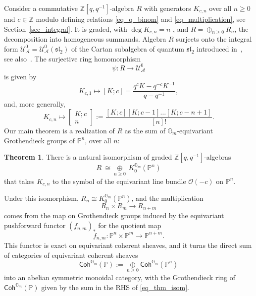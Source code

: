 \documentclass{article}
\def\lra{\longrightarrow}
\def\mf{\mathfrak}
\def\Z{\mathbb Z}
\newcommand{\Coh}{\mathsf{Coh}}
\newcommand{\mcO}{\mathcal{O}}
\newcommand{\mcA}{\mathcal{A}}
\newcommand{\PP}{\mathbb{P}}
\newcommand{\UzeroA}{\mathcal{U}^0_{\mcA}}
\newcommand{\bmat}[3]{
  \begin{bmatrix}
    #1 ; #2 \\
    #3
  \end{bmatrix}
}
\newcommand{\oplusop}[1]{{\mathop{\oplus}\limits_{#1}}}
\theoremstyle{definition}
\newtheorem{thm}{Theorem}[section]
\theoremstyle{definition}
\begin{document}
Consider a commutative $\Z[q,q^{-1}]$-algebra $R$ with generators $K_{c,n}$ over all $n\ge 0$ and $c\in \Z$ modulo defining relations \eqref{eq_q_binom} and \eqref{eq_multiplication},  see Section~\ref{sec_integral}. It is graded, with $\deg K_{c,n}=n$ , and $R=\oplus_{n\ge 0}R_n$,  the decomposition into homogeneous summands. Algebra $R$ surjects onto the integral form $\UzeroA=\UzeroA(\mf{sl}_2)$ of the Cartan subalgebra of quantum $\mf{sl}_2$ introduced in~\cite{Lusztig2,Lusztig1}, see also~\cite{MartinezRuiz2025,GMSW1}.  The surjective ring homomorphism
\begin{equation}\label{eq_hom_surj}
\psi:R\lra \UzeroA
\end{equation}
is given by
\[
K_{c,1}\longmapsto [K;c] = \frac{q^c K - q^{-c} K^{-1}}{q-q^{-1}},
\]
and, more generally,
\begin{equation}\label{eq_Kcn_int}
K_{c,n} \longmapsto
\bmat{K}{c}{n} := \frac{[K;c][K;c-1]\dots [K;c-n+1]}{[n]!}.
\end{equation}
Our main theorem is a realization of $R$ as the sum of $\mathbb{G}_m$-equivariant Grothendieck groups of $\PP^n$, over all $n$:
\begin{thm}\label{thm_isom}
    There is a natural isomorphism of graded $\Z[q,q^{-1}]$-algebras
    \begin{equation}\label{eq_thm_isom}
    R\ \cong \oplusop{n\ge 0}\, K_0^{\mathbb{G}_m}(\PP^n)
    \end{equation}
    that takes $K_{c,n}$ to the symbol of the equivariant line bundle $\mcO(-c)$ on $\PP^n$.
\end{thm}
Under this isomorphism, $R_n\cong K_0^{\mathbb{G}_m}(\PP^n)$, and the multiplication
\[
R_n\times R_m\lra R_{n+m}
\]
comes from the map on Grothendieck groups induced by the equivariant pushforward functor $(f_{n,m})_{\ast}$ for the quotient map
\begin{equation}\label{eq_fnm}
f_{n,m}:\PP^n\times \PP^m\lra \PP^{n+m}.
\end{equation}
This functor is exact on equivariant coherent sheaves, and it turns the direct sum of categories of equivariant coherent sheaves
\begin{equation}\label{eq_coh_all_n}
\Coh^{\mathbb{G}_m}(\PP) := \oplusop{n\ge 0}\Coh^{\mathbb{G}_m}(\PP^n)
\end{equation}
into an abelian symmetric monoidal category, with the Grothendieck ring of $\Coh^{\mathbb{G}_m}(\PP)$ given by the sum in the RHS of \eqref{eq_thm_isom}.
\end{document}
